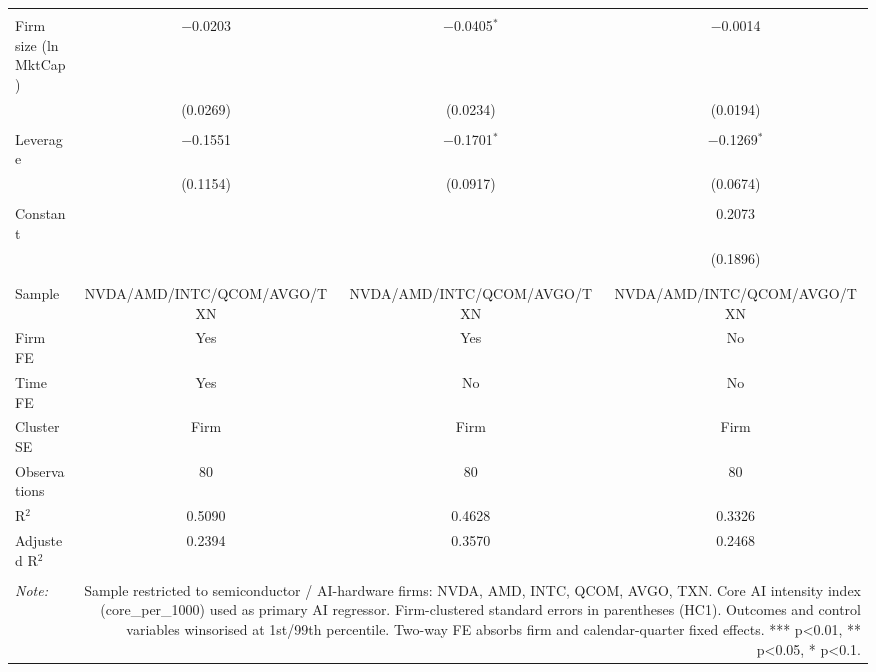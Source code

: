 \begin{table}[!htbp]
\begin{tabular}{@{\extracolsep{5pt}}lccc}
  & & & \\ 
 Firm size (ln MktCap) & $-$0.0203 & $-$0.0405$^{*}$ & $-$0.0014 \\ 
  & (0.0269) & (0.0234) & (0.0194) \\ 
  & & & \\ 
 Leverage & $-$0.1551 & $-$0.1701$^{*}$ & $-$0.1269$^{*}$ \\ 
  & (0.1154) & (0.0917) & (0.0674) \\ 
  & & & \\ 
 Constant &  &  & 0.2073 \\ 
  &  &  & (0.1896) \\ 
  & & & \\ 
\hline \\[-1.8ex] 
Sample & NVDA/AMD/INTC/QCOM/AVGO/TXN & NVDA/AMD/INTC/QCOM/AVGO/TXN & NVDA/AMD/INTC/QCOM/AVGO/TXN \\ 
Firm FE & Yes & Yes & No \\ 
Time FE & Yes & No & No \\ 
Cluster SE & Firm & Firm & Firm \\ 
Observations & 80 & 80 & 80 \\ 
R$^{2}$ & 0.5090 & 0.4628 & 0.3326 \\ 
Adjusted R$^{2}$ & 0.2394 & 0.3570 & 0.2468 \\ 
\hline 
\hline \\[-1.8ex] 
\textit{Note:}  & \multicolumn{3}{r}{Sample restricted to semiconductor / AI-hardware firms: NVDA, AMD, INTC, QCOM, AVGO, TXN. Core AI intensity index (core_per_1000) used as primary AI regressor. Firm-clustered standard errors in parentheses (HC1). Outcomes and control variables winsorised at 1st/99th percentile. Two-way FE absorbs firm and calendar-quarter fixed effects. *** p<0.01, ** p<0.05, * p<0.1.} \\ 
\end{tabular} 
\end{table} 
